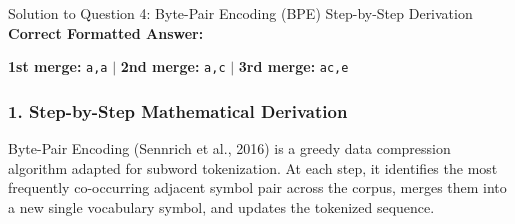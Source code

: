 \documentclass[11pt,a4paper]{article}
\begin{document}
\begin{solutionbox}{Solution to Question 4: Byte-Pair Encoding (BPE) Step-by-Step Derivation}
\textbf{Correct Formatted Answer:}
\begin{center}
\textbf{1st merge:} \texttt{a,a} \quad$\vert$\quad
\textbf{2nd merge:} \texttt{a,c} \quad$\vert$\quad
\textbf{3rd merge:} \texttt{ac,e}
\end{center}

\subsubsection*{1. Step-by-Step Mathematical Derivation}
Byte-Pair Encoding (Sennrich et al., 2016) is a greedy data compression algorithm adapted for subword tokenization. At each step, it identifies the most frequently co-occurring adjacent symbol pair across the corpus, merges them into a new single vocabulary symbol, and updates the tokenized sequence.


\end{solutionbox}
\end{document}
